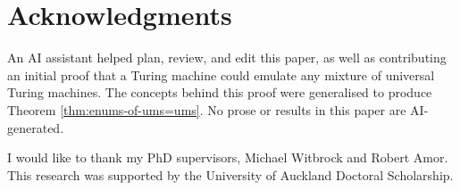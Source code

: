 \documentclass[11pt]{article}
\begin{document}
\section*{Acknowledgments}
An AI assistant helped plan, review, and edit this paper, as well as contributing an initial proof that a Turing machine could emulate any mixture of universal Turing machines. The concepts behind this proof were generalised to produce Theorem \ref{thm:enums-of-ums=ums}.
No prose or results in this paper are AI-generated.

I would like to thank my PhD supervisors, Michael Witbrock and Robert Amor.
This research was supported by the University of Auckland Doctoral Scholarship.


\end{document}

